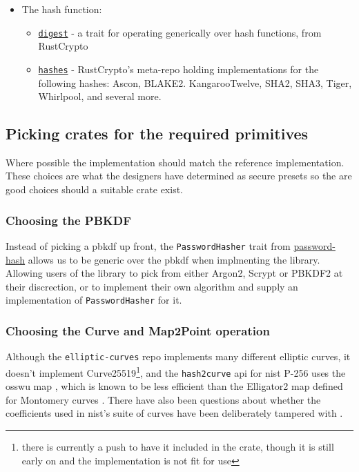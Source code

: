 \begin{itemize}
  \item{
    The hash function:
    \begin{itemize}
      \item{\href{https://github.com/RustCrypto/traits/tree/master/digest}{\texttt{digest}} - a trait for operating generically over hash functions, from RustCrypto}
      \item{\href{https://github.com/RustCrypto/hashes}{\texttt{hashes}} - RustCrypto's meta-repo holding implementations for the following hashes: Ascon, BLAKE2. KangarooTwelve, SHA2, SHA3, Tiger, Whirlpool, and several more.}
    \end{itemize}
  }
\end{itemize}

\subsection{Picking crates for the required primitives}
Where possible the implementation should match the reference implementation.
These choices are what the designers have determined as secure presets so the are good choices should a suitable crate exist.

\subsubsection{Choosing the PBKDF}
Instead of picking a \gls{pbkdf} up front, the \texttt{PasswordHasher} trait from \href{https://github.com/RustCrypto/traits/tree/master/password-hash}{password-hash} allows us to be generic over the \gls{pbkdf} when implmenting the library.
Allowing users of the library to pick from either Argon2, Scrypt or PBKDF2 at their discrection, or to implement their own algorithm and supply an implementation of \texttt{PasswordHasher} for it.

\subsubsection{Choosing the Curve and \textsf{Map2Point} operation}
Although the \texttt{elliptic-curves} repo implements many different elliptic curves, it doesn't implement Curve25519\footnote{there is currently a push to have it included in the crate, though it is still early on and the implementation is not fit for use}, and the \texttt{hash2curve} \gls{api} for \gls{nist} P-256 uses the \gls{osswu} map \cite{osswu-map}, which is known to be less efficient than the Elligator2 map defined for Montomery curves \cite{elligator2}.
There have also been questions about whether the coefficients used in \gls{nist}'s suite of curves have been deliberately tampered with \cite{curve-rigidity}.

